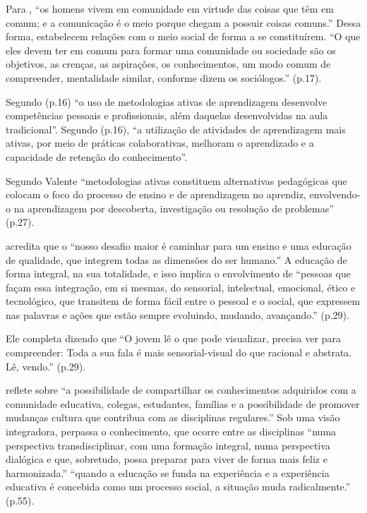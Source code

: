 Para , ``os homens vivem em comunidade em virtude das coisas que têm em comum; e a comunicação é o meio porque chegam a possuir coisas comuns.'' Dessa forma, estabelecem relações com o meio social de forma a se constituírem. ``O que eles devem ter em comum para formar uma comunidade ou sociedade são os objetivos, as crenças, as aspirações, os conhecimentos, um modo comum de compreender, mentalidade similar, conforme dizem os sociólogos.'' \cite{DEWEY1979} (p.17).

Segundo  (p.16) ``o uso de metodologias ativas de aprendizagem desenvolve competências pessoais e profissionais, além daquelas desenvolvidas na aula tradicional''. Segundo   (p.16), ``a utilização de atividades de aprendizagem mais ativas, por meio de práticas colaborativas, melhoram o aprendizado e a capacidade de retenção do conhecimento''.

Segundo Valente ``metodologias ativas constituem alternativas pedagógicas que colocam o foco do processo de ensino e de aprendizagem no aprendiz, envolvendo-o na aprendizagem por descoberta, investigação ou resolução de problemas'' \cite{VALENTE2018} (p.27).

 acredita que o ``nosso desafio maior é caminhar para um ensino e uma educação de qualidade, que integrem todas as dimensões do ser humano.'' A educação de forma integral, na sua totalidade, e isso implica o envolvimento de ``pessoas que façam essa integração, em si mesmas, do sensorial, intelectual, emocional, ético e tecnológico, que transitem de forma fácil entre o pessoal e o social, que expressem nas palavras e ações que estão sempre evoluindo, mudando, avançando.'' \cite{MORAN2012} (p.29).

Ele completa dizendo que ``O jovem lê o que pode visualizar, precisa ver para compreender: Toda a sua fala é mais sensorial-visual do que racional e abstrata. Lê, vendo.'' \cite{MORAN1995} (p.29).

 reflete sobre ``a possibilidade de compartilhar os conhecimentos adquiridos com a comunidade educativa, colegas, estudantes, famílias e a possibilidade de promover mudanças cultura que contribua com as disciplinas regulares.'' Sob uma visão integradora, perpassa o conhecimento, que ocorre entre as disciplinas ``numa perspectiva transdisciplinar, com uma formação integral, numa perspectiva dialógica e que, sobretudo, possa preparar para viver de forma mais feliz e harmonizada.'' ``quando a educação se funda na experiência e a experiência educativa é concebida como um processo social, a situação muda radicalmente.'' \cite{DEWEY1979} (p.55).

